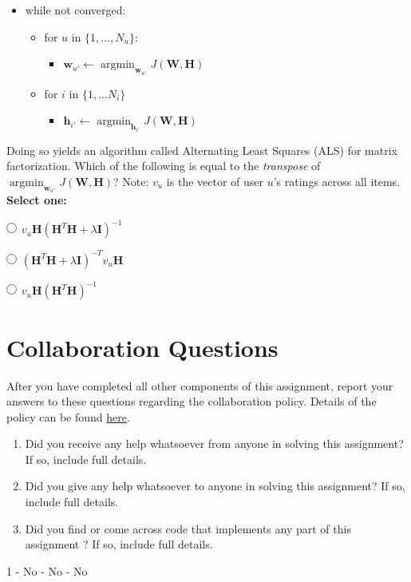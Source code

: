 \documentclass[11pt,addpoints,answers]{exam}
\renewcommand{\circle}{\tikz\draw[black] (0,0) circle (1ex);}
\newcommand{\hv}{\mathbf{h}}
\newcommand{\wv}{\mathbf{w}}
\newcommand{\Hv}{\mathbf{H}}
\newcommand{\Iv}{\mathbf{I}}
\newcommand{\Wv}{\mathbf{W}}
\newcommand \argmin {\operatorname*{argmin}}
\begin{document}
\begin{questions}
\begin{parts}
     \begin{itemize}
         \item while not converged:
         \begin{itemize}
            \item for $u$ in $\{1, \ldots, N_u\}$:
            \begin{itemize}
                \item $\wv_{u'} \leftarrow \argmin_{\wv_{u'}} J(\Wv, \Hv)$
            \end{itemize}
            \item for $i$ in $\{1, \ldots N_i\}$
             \begin{itemize}
                \item $\hv_{i'} \leftarrow \argmin_{\hv_{i'}} J(\Wv, \Hv)$
            \end{itemize}
         \end{itemize}
     \end{itemize}
     
     Doing so yields an algorithm called Alternating Least Squares (ALS) for matrix factorization. Which of the following is equal to the \emph{transpose} of $\argmin_{\wv_{u'}} J(\Wv, \Hv)$? Note: $v_u$ is the vector of user $u$'s ratings across all items. \\
     \textbf{Select one:}

        \begin{list}{}
        \item $\circle$ $v_u\Hv(\Hv^T\Hv+\lambda \Iv)^{-1}$
        \item $\circle$ $(\Hv^T\Hv+\lambda \Iv)^{-T}v_u\Hv$
        \item $\circle$ $v_u\Hv(\Hv^T\Hv)^{-1}$
    \end{list}  
    
    

\end{parts}
\end{questions}

\newpage
\section{Collaboration Questions}
After you have completed all other components of this assignment, report your answers to these questions regarding the collaboration policy. Details of the policy can be found \href{http://www.cs.cmu.edu/~mgormley/courses/10601/syllabus.html}{here}.
\begin{enumerate}
    \item Did you receive any help whatsoever from anyone in solving this assignment? If so, include full details.
    \item Did you give any help whatsoever to anyone in solving this assignment? If so, include full details.
    \item Did you find or come across code that implements any part of this assignment ? If so, include full details.
\end{enumerate}

\begin{your_solution}[height=6cm]
1 - No - No - No
\end{your_solution}
\end{document}
